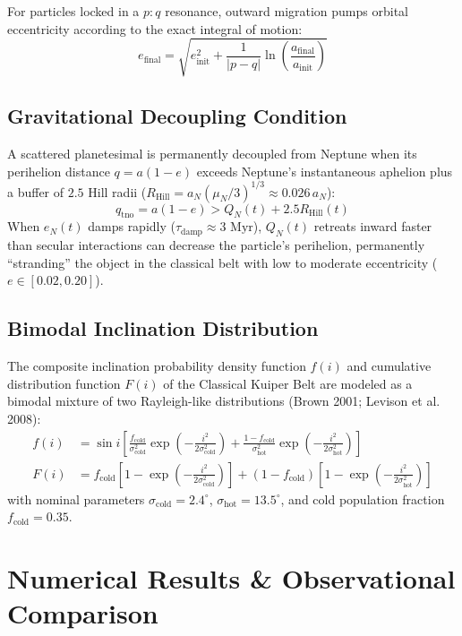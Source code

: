 \documentclass[11pt,a4paper]{article}
\begin{document}
For particles locked in a $p:q$ resonance, outward migration pumps orbital eccentricity according to the exact integral of motion:
\begin{equation}
e_{\text{final}} = \sqrt{e_{\text{init}}^2 + \frac{1}{|p-q|} \ln\left(\frac{a_{\text{final}}}{a_{\text{init}}}\right)}
\end{equation}

\subsection{Gravitational Decoupling Condition}
A scattered planetesimal is permanently decoupled from Neptune when its perihelion distance $q = a(1 - e)$ exceeds Neptune's instantaneous aphelion plus a buffer of $2.5$ Hill radii ($R_{\text{Hill}} = a_N (\mu_N / 3)^{1/3} \approx 0.026\, a_N$):
\begin{equation}
q_{\text{tno}} = a(1 - e) > Q_N(t) + 2.5 R_{\text{Hill}}(t)
\end{equation}
When $e_N(t)$ damps rapidly ($\tau_{\text{damp}} \approx 3\text{ Myr}$), $Q_N(t)$ retreats inward faster than secular interactions can decrease the particle's perihelion, permanently ``stranding'' the object in the classical belt with low to moderate eccentricity ($e \in [0.02, 0.20]$).

\subsection{Bimodal Inclination Distribution}
The composite inclination probability density function $f(i)$ and cumulative distribution function $F(i)$ of the Classical Kuiper Belt are modeled as a bimodal mixture of two Rayleigh-like distributions (Brown 2001; Levison et al. 2008):
\begin{align}
f(i) &= \sin i \left[ \frac{f_{\text{cold}}}{\sigma_{\text{cold}}^2} \exp\left(-\frac{i^2}{2\sigma_{\text{cold}}^2}\right) + \frac{1 - f_{\text{cold}}}{\sigma_{\text{hot}}^2} \exp\left(-\frac{i^2}{2\sigma_{\text{hot}}^2}\right) \right] \\
F(i) &= f_{\text{cold}} \left[ 1 - \exp\left(-\frac{i^2}{2\sigma_{\text{cold}}^2}\right) \right] + (1 - f_{\text{cold}}) \left[ 1 - \exp\left(-\frac{i^2}{2\sigma_{\text{hot}}^2}\right) \right]
\end{align}
with nominal parameters $\sigma_{\text{cold}} = 2.4^\circ$, $\sigma_{\text{hot}} = 13.5^\circ$, and cold population fraction $f_{\text{cold}} = 0.35$.

\section{Numerical Results \& Observational Comparison}
\end{document}
